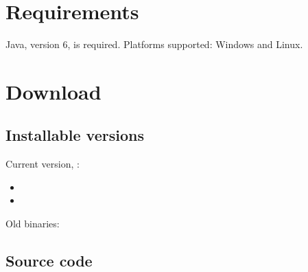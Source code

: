 \documentclass[polish,a4paper,11pt,oneside]{article}
\begin{document}

\section{Requirements}

Java, version 6, is required. Platforms supported: Windows and Linux.

\section{Download} \label{download}

\subsection{Installable versions} \label{downloadBin}

Current version, \version{}:

\begin{itemize}
\item
\item

\end{itemize}

Old binaries:
\oldBinaries

\subsection{Source code} \label{downloadSrc}
\end{document}
